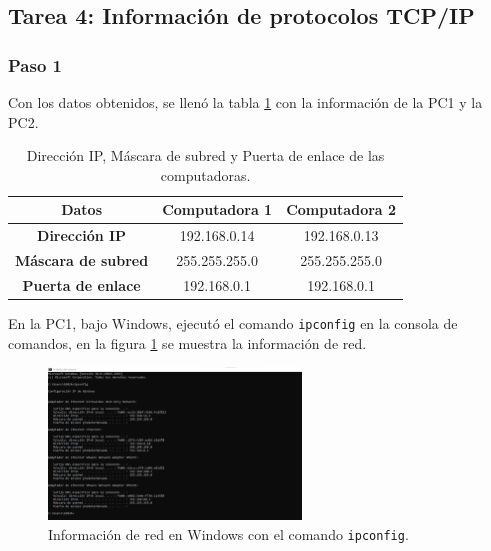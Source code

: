     \subsection{Tarea 4: Información de protocolos TCP/IP}
        \subsubsection*{Paso 1}

        Con los datos obtenidos, se llenó la tabla \ref{tab:informacion_tcpip} con la información de la PC1 y la PC2.

        \begin{table}[H]
            \begin{center}
                \begin{tabular}{ c | c | c}
                    \textbf{Datos} & \textbf{Computadora 1} & \textbf{Computadora 2} \\ \hline
                    \textbf{Dirección IP} & 192.168.0.14 & 192.168.0.13\\
                    \textbf{Máscara de subred} & 255.255.255.0 & 255.255.255.0\\
                    \textbf{Puerta de enlace} & 192.168.0.1 & 192.168.0.1\\
                \end{tabular}
                \caption{Dirección IP, Máscara de subred y Puerta de enlace de las computadoras.}
                \label{tab:informacion_tcpip}
                \end{center}
        \end{table}

        En la PC1, bajo Windows, ejecutó el comando \texttt{ipconfig} en la consola de comandos, en la figura \ref{fig:ipconfig_windows} se muestra la información de red.

        \begin{figure}[H]
            \centering
            \includegraphics[width=0.6\textwidth]{img/ipconfig_windows.png}
            \caption{Información de red en Windows con el comando \texttt{ipconfig}.}
            \label{fig:ipconfig_windows}
        \end{figure}

